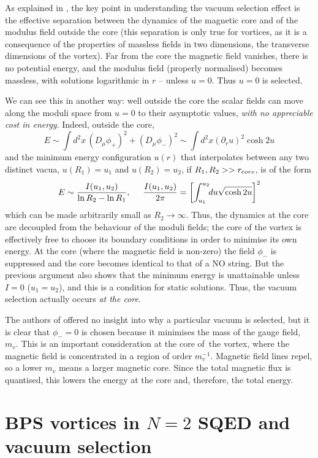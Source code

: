 \documentclass[a4paper,aps,prd,superscriptaddress,floats]{revtex4}
\begin{document}
As explained in \cite{PRTT96}, the key point in understanding the
 vacuum selection effect is the effective separation between the
 dynamics of the magnetic core and of the modulus field outside the
 core (this separation is only true for vortices, as it is a
 consequence of the properties of massless fields in two dimensions,
 the transverse dimensions of the vortex).  Far from the core the
 magnetic field vanishes, there is no potential energy, and the
 modulus field (properly normalised) becomes massless, with solutions
 logarithmic in $r$ -- unless $u=0$.  Thus $u=0$ is selected.

We can see this in another way:
well outside the core the scalar fields can move along 
the moduli space from $u=0$ to their asymptotic values, {\it with no 
appreciable cost in energy}. Indeed, outside the core,
\[
E \sim \int d^2x\, (D_\mu \phi_+)^2 + (D_\mu \phi_-)^2 \sim
\int d^2x (\partial_r u)^2 \cosh 2u 
\]
and the minimum energy configuration $u(r)$ that interpolates between
any two distinct vacua, $u(R_1)=u_1 $ and $u(R_2) = u_2$, if $R_1, R_2 >> 
r_{\text core}$, is of the form
\[
 E \sim {I(u_1, u_2) \over {\ln R_2 - \ln R_1}},
\hspace{0.5cm}
{I (u_1, u_2)\over{2\pi}} =\left[
 \int_{u_1}^{u_2}\!\! du\sqrt{\cosh 2u}\right]^2
\]
which can be made arbitrarily small as $R_2 \to \infty$.  Thus, the
dynamics at the core are decoupled from the behaviour of the moduli
fields; the core of the vortex is effectively free to choose its
boundary conditions in order to minimise its own energy.  At the core
(where the magnetic field is non-zero) the field $\phi_-$ is
suppressed and the core becomes identical to that of a NO string.  But
the previous argument also shows that the minimum energy is
unattainable unless $I=0$ ($u_1=u_2$), and this is a condition for
static solutions.  Thus, the vacuum selection actually occurs {\it at
the core}.  

The authors of \cite{PRTT96} offered no insight into why a particular
vacuum is selected, but it is clear that $\phi_-=0$ is chosen because
it minimises the mass of the gauge field, $m_v$.  This is an important
consideration at the core of~the vortex, where the magnetic field is
concentrated in a region of order $m_v^{-1}$. Magnetic field lines
repel, so a lower $m_v$ means a larger magnetic core. Since the total
magnetic flux is quantised, this lowers the energy at the core and,
therefore, the total energy.

\section{BPS vortices in $N\!=\!2$ SQED and vacuum selection}
\end{document}
